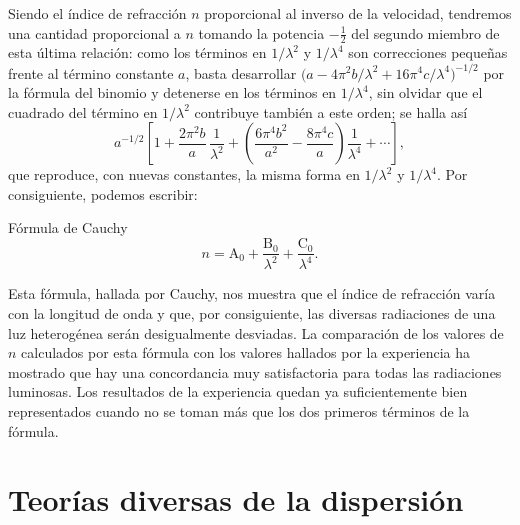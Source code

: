 Siendo el índice de refracción $n$ proporcional al inverso de la
velocidad, tendremos una cantidad proporcional a $n$ tomando la potencia
$-\tfrac12$ del segundo miembro de esta última relación: como los términos
en $1/\lambda^2$ y $1/\lambda^4$ son correcciones pequeñas frente al
término constante $a$, basta desarrollar
$\bigl(a-4\pi^2b/\lambda^2+16\pi^4c/\lambda^4\bigr)^{-1/2}$ por la fórmula
del binomio y detenerse en los términos en $1/\lambda^4$, sin olvidar que el
cuadrado del término en $1/\lambda^2$ contribuye también a este orden; se
halla así
\[
a^{-1/2}\left[1+\frac{2\pi^2b}{a}\,\frac{1}{\lambda^2}
+\left(\frac{6\pi^4b^2}{a^2}-\frac{8\pi^4c}{a}\right)\frac{1}{\lambda^4}
+\cdots\right],
\]
que reproduce, con nuevas constantes, la misma forma en $1/\lambda^2$ y
$1/\lambda^4$. Por consiguiente, podemos escribir:

\begin{enunciado}{Fórmula de Cauchy}
\[
n=\mathrm A_0+\frac{\mathrm B_0}{\lambda^2}+\frac{\mathrm C_0}{\lambda^4}.
\]
\end{enunciado}

\noindent Esta fórmula, hallada por Cauchy, nos muestra que el índice de
refracción varía con la longitud de onda y que, por consiguiente, las
diversas radiaciones de una luz heterogénea serán desigualmente desviadas.
La comparación de los valores de $n$ calculados por esta fórmula con los
valores hallados por la experiencia ha mostrado que hay una concordancia
muy satisfactoria para todas las radiaciones luminosas. Los resultados de
la experiencia quedan ya suficientemente bien representados cuando no se
toman más que los dos primeros términos de la fórmula.

\section{Teorías diversas de la dispersión}

